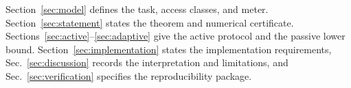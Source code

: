 Section~\ref{sec:model} defines the task, access classes, and meter. Section~\ref{sec:statement} states the theorem and numerical certificate. Sections~\ref{sec:active}--\ref{sec:adaptive} give the active protocol and the passive lower bound. Section~\ref{sec:implementation} states the implementation requirements, Sec.~\ref{sec:discussion} records the interpretation and limitations, and Sec.~\ref{sec:verification} specifies the reproducibility package.
